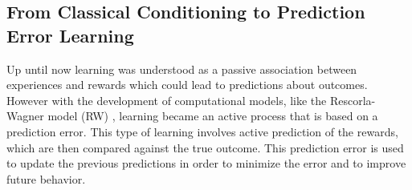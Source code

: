 


\subsection{From Classical Conditioning to Prediction Error Learning}
Up until now learning was understood as a passive association between experiences and rewards which could lead to predictions about outcomes. However with the development of computational models, like the Rescorla-Wagner model (RW) \citep{rescorla1972theory}, learning became an active process that is based on a prediction error. This type of learning involves active prediction of the rewards, which are then compared against the true outcome. This prediction error is used to update the previous predictions in order to minimize the error and to improve future behavior. 

